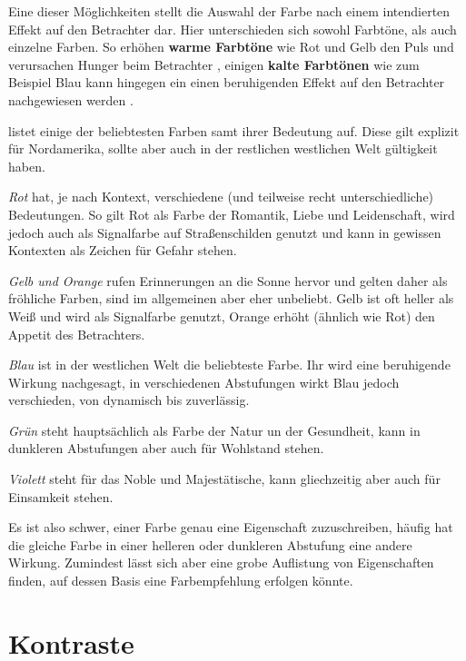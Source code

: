 Eine dieser Möglichkeiten stellt die Auswahl der Farbe nach einem intendierten Effekt auf den Betrachter dar.
Hier unterschieden sich sowohl Farbtöne, als auch einzelne Farben.
So erhöhen \textbf{warme Farbtöne} wie Rot und Gelb den Puls und verursachen Hunger beim Betrachter \cite{berman2010street},
einigen \textbf{kalte Farbtönen} wie zum Beispiel Blau kann hingegen ein einen beruhigenden Effekt auf den Betrachter nachgewiesen werden \cite{crozier1999meanings}.

\cite{berman2010street} listet einige der beliebtesten Farben samt ihrer Bedeutung auf. Diese gilt explizit für Nordamerika, sollte aber auch in der restlichen westlichen Welt gültigkeit haben.

\textit{Rot} hat, je nach Kontext, verschiedene (und teilweise recht unterschiedliche) Bedeutungen. So gilt Rot als Farbe der Romantik, Liebe und Leidenschaft, wird jedoch auch als Signalfarbe auf Straßenschilden genutzt und kann in gewissen Kontexten als Zeichen für Gefahr stehen.

\textit{Gelb und Orange} rufen Erinnerungen an die Sonne hervor und gelten daher als fröhliche Farben, sind im allgemeinen aber eher unbeliebt. Gelb ist oft heller als Weiß und wird als Signalfarbe genutzt, Orange erhöht (ähnlich wie Rot) den Appetit des Betrachters.

\textit{Blau} ist in der westlichen Welt die beliebteste Farbe. Ihr wird eine beruhigende Wirkung nachgesagt, in verschiedenen Abstufungen wirkt Blau jedoch verschieden, von dynamisch bis zuverlässig.

\textit{Grün} steht hauptsächlich als Farbe der Natur un der Gesundheit, kann in dunkleren Abstufungen aber auch für Wohlstand stehen.

\textit{Violett} steht für das Noble und Majestätische, kann gliechzeitig aber auch für Einsamkeit stehen.

Es ist also schwer, einer Farbe genau eine Eigenschaft zuzuschreiben, häufig hat die gleiche Farbe in einer helleren oder dunkleren Abstufung eine andere Wirkung. Zumindest lässt sich aber eine grobe Auflistung von Eigenschaften finden, auf dessen Basis eine Farbempfehlung erfolgen könnte.


\section{Kontraste}

